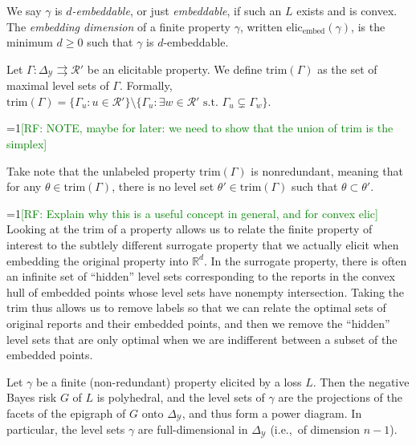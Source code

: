 \documentclass[anon,12pt]{colt2019}
\newcommand{\Comments}{1}
\newcommand{\mynote}[2]{\ifnum\Comments=1\textcolor{#1}{#2}\fi}
\newcommand{\raf}[1]{\mynote{green}{[RF: #1]}}
\newcommand{\reals}{\mathbb{R}}
\newcommand{\elicembed}{\mathrm{elic}_\mathrm{embed}}
\newcommand{\simplex}{\Delta_\Y}
\newcommand{\R}{\mathcal{R}}
\newcommand{\Y}{\mathcal{Y}}
\newcommand{\toto}{\rightrightarrows}
\newcommand{\trim}{\mathrm{trim}}
\begin{document}
\begin{definition}
  We say $\gamma$ is \emph{$d$-embeddable}, or just \emph{embeddable}, if such an $L$ exists and is convex.
  The \emph{embedding dimension} of a finite property $\gamma$, written $\elicembed(\gamma)$, is the minimum $d\geq 0$ such that $\gamma$ is $d$-embeddable.
\end{definition}

\begin{definition}\label{def:trim}
  Let $\Gamma:\simplex \toto\R'$ be an elicitable property.
  We define $\trim(\Gamma)$ as the set of maximal level sets of $\Gamma$.
  Formally, $\trim(\Gamma) = \{\Gamma_u : u \in \R'\} \setminus \{ \Gamma_u : \exists w \in \R' \text{ s.t. } \Gamma_u \subsetneq \Gamma_w \}$.
\end{definition}
\raf{NOTE, maybe for later: we need to show that the union of trim is the simplex}

Take note that the unlabeled property $\trim(\Gamma)$ is nonredundant, meaning that for any $\theta \in \trim(\Gamma)$, there is no level set $\theta' \in \trim(\Gamma)$ such that $\theta \subset \theta'$.

\raf{Explain why this is a useful concept in general, and for convex elic}
Looking at the $\trim$ of a property allows us to relate the finite property of interest to the subtlely different surrogate property that we actually elicit when embedding the original property into $\reals^d$.
In the surrogate property, there is often an infinite set of ``hidden'' level sets corresponding to the reports in the convex hull of embedded points whose level sets have nonempty intersection.
Taking the $\trim$ thus allows us to remove labels so that we can relate the optimal sets of original reports and their embedded points, and then we remove the ``hidden'' level sets that are only optimal when we are indifferent between a subset of the embedded points.

\begin{lemma}\label{lem:finite-full-dim}
  Let $\gamma$ be a finite (non-redundant) property elicited by a loss $L$.
  Then the negative Bayes risk $G$ of $L$ is polyhedral, and the level sets of $\gamma$ are the projections of the facets of the epigraph of $G$ onto $\simplex$, and thus form a power diagram.
  In particular, the level sets $\gamma$ are full-dimensional in $\simplex$ (i.e.,\ of dimension $n-1$).
\end{lemma}
\end{document}
